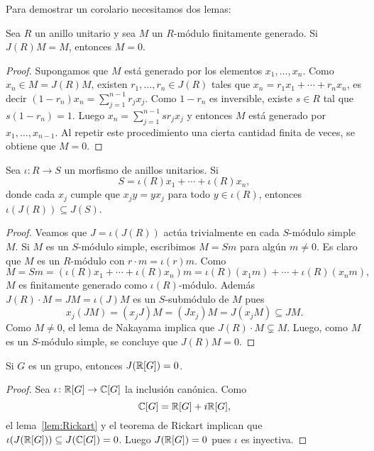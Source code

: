 Para demostrar un corolario necesitamos dos lemas:

\begin{lemma}[Nakayama]
	\label{lem:Nakayama}
	Sea $R$ un anillo unitario y sea $M$ un $R$-módulo finitamente generado. Si
	$J(R)M=M$, entonces $M=0$.
\end{lemma}

\begin{proof}
	Supongamos que $M$ está generado por los elementos $x_1,\dots,x_n$. Como $x_n\in M=J(R)M$, 
	existen $r_1,\dots,r_n\in J(R)$ tales que $x_n=r_1x_1+\cdots+r_nx_n$, es decir
	$(1-r_n)x_n=\sum_{j=1}^{n-1}r_jx_j$. 
	Como $1-r_n$ es inversible, existe $s\in R$ tal que $s(1-r_n)=1$. Luego
	$x_n=\sum_{j=1}^{n-1}sr_jx_j$ 
	y entonces $M$ está generado por $x_1,\dots,x_{n-1}$. Al repetir este
	procedimiento una cierta cantidad finita de veces, se obtiene que $M=0$.
\end{proof}

\begin{lemma}
	\label{lem:Rickart}
	Sea $\iota\colon R\to S$ un morfismo de anillos unitarios. Si 
	\[
	S=\iota(R)x_1+\cdots+\iota(R)x_n,
	\]
	donde cada $x_j$ cumple que $x_jy=yx_j$ para todo $y\in\iota(R)$, entonces
	$\iota(J(R))\subseteq J(S)$.
\end{lemma}

\begin{proof}
	Veamos que $J=\iota(J(R))$ actúa trivialmente en cada $S$-módulo simple $M$.
	Si $M$ es un $S$-módulo simple, escribimos $M=Sm$ para algún $m\ne0$. Es
	claro que $M$ es un $R$-módulo con $r\cdot m=\iota(r)m$. Como
	\[
		M=Sm=(\iota(R)x_1+\cdots+\iota(R)x_n)m=\iota(R)(x_1m)+\cdots+\iota(R)(x_nm),
	\]
	$M$ es finitamente generado como $\iota(R)$-módulo. Además $J(R)\cdot
	M=JM=\iota(J)M$ es un $S$-submódulo de $M$ pues
	\[
		x_j(JM)=(x_jJ)M=(Jx_j)M=J(x_jM)\subseteq JM.
	\]
	Como $M\ne0$, el lema de Nakayama implica que $J(R)\cdot M\subsetneq M$. Luego,
	como $M$ es un $S$-módulo simple, se concluye que $J(R)M=0$.
\end{proof}

\begin{corollary}
	Si $G$ es un grupo, entonces $J(\mathbb{R}[G])=0$. 
\end{corollary}

\begin{proof}
	Sea $\iota\colon \mathbb{R}[G]\to\mathbb{C}[G]$ la inclusión canónica. Como 
	\[
	\mathbb{C}[G]=\mathbb{R}[G]+i\mathbb{R}[G],
	\]
	el lema~\ref{lem:Rickart} y el teorema de Rickart implican que
	$\iota(J(\mathbb{R}[G]))\subseteq J(\mathbb{C}[G])=0$. Luego $J(\mathbb{R}[G])=0$ pues $\iota$ es
	inyectiva. 
\end{proof}

